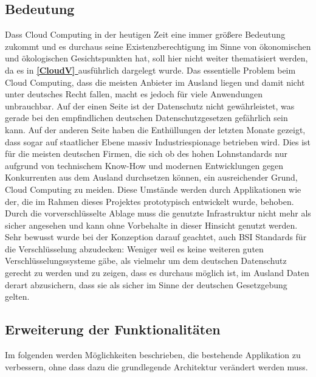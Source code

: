 \documentclass[12pt,a4paper,bibliography=totocnumbered,listof=totocnumbered]{scrartcl}
\newcommand*{\fullref}[1]{\textbf{\hyperref[{#1}]{\ref*{#1} \nameref*{#1}}}}
\begin{document}
\subsection{Bedeutung}
Dass Cloud Computing in der heutigen Zeit eine immer größere Bedeutung zukommt und es durchaus seine Existenzberechtigung im Sinne von ökonomischen und ökologischen Gesichtspunkten hat, soll hier nicht weiter thematisiert werden, da es in \fullref{CloudV} ausführlich dargelegt wurde. Das essentielle Problem beim Cloud Computing, dass die meisten Anbieter im Ausland liegen und damit nicht unter deutsches Recht fallen, macht es jedoch für viele Anwendungen unbrauchbar. Auf der einen Seite ist der Datenschutz nicht gewährleistet, was gerade bei den empfindlichen deutschen Datenschutzgesetzen gefährlich sein kann. Auf der anderen Seite haben die Enthüllungen der letzten Monate gezeigt, dass sogar auf staatlicher Ebene massiv Industriespionage betrieben wird. Dies ist für die meisten deutschen Firmen, die sich ob des hohen Lohnstandards nur aufgrund von technischem Know-How und modernen Entwicklungen gegen Konkurrenten aus dem Ausland durchsetzen können, ein ausreichender Grund, Cloud Computing zu meiden. Diese Umstände werden durch Applikationen wie der, die im Rahmen dieses Projektes prototypisch entwickelt wurde, behoben. Durch die vorverschlüsselte Ablage muss die genutzte Infrastruktur nicht mehr als sicher angesehen und kann ohne Vorbehalte in dieser Hinsicht genutzt werden. Sehr bewusst wurde bei der Konzeption darauf geachtet, auch BSI Standards für die Verschlüsselung abzudecken: Weniger weil es keine weiteren guten Verschlüsselungssysteme gäbe, als vielmehr um dem deutschen Datenschutz gerecht zu werden und zu zeigen, dass es durchaus möglich ist, im Ausland Daten derart abzusichern, dass sie als sicher im Sinne der deutschen Gesetzgebung gelten.

\subsection{Erweiterung der Funktionalitäten}
Im folgenden werden Möglichkeiten beschrieben, die bestehende Applikation zu verbessern, ohne dass dazu die grundlegende Architektur verändert werden muss.
\end{document}
